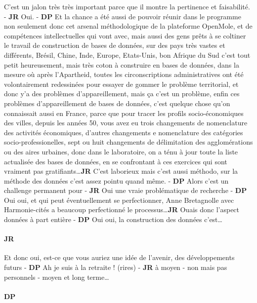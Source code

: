 \documentclass[12pt]{article}
\begin{document}
C'est un jalon très très important parce que il montre la pertinence et faisabilité. - \textbf{JR} Oui. - \textbf{DP} Et la chance a été aussi de pouvoir réunir dans le programme non seulement donc cet arsenal méthodologique de la plateforme OpenMole, et de compétences intellectuelles qui vont avec, mais aussi des gens prêts à se coltiner le travail de construction de bases de données, sur des pays très vastes et différents, Brésil, Chine, Inde, Europe, Etats-Unis, bon Afrique du Sud c'est tout petit heureusement, mais très coton à construire en bases de données, dans la mesure où après l'Apartheid, toutes les circonscriptions administratives ont été volontairement redessinées pour essayer de gommer le problème territorial, et donc y'a des problèmes d'appareillement, mais ça c'est un problème, enfin ces problèmes d'appareillement de bases de données, c'est quelque chose qu'on connaissait aussi en France, parce que pour tracer les profils socio-économiques des villes, depuis les années 50, vous avez eu trois changements de nomenclature des activités économiques, d'autres changements e nomenclature des catégories socio-professionelles, sept ou huit changements de délimitation des agglomérations ou des aires urbaines, donc dans le laboratoire, on a ténu à jour toute la liste actualisée des bases de données, en se confrontant à ces exercices qui sont vraiment pas gratifiants\ldots \textbf{JR} C'est laborieux mais c'est aussi méthodo, sur la méthode des données c'est assez pointu quand même. - \textbf{DP} Alors c'est un challenge permanent pour - \textbf{JR} Oui une vraie problématique de recherche - \textbf{DP} Oui oui, et qui peut éventuellement se perfectionner, Anne Bretagnolle avec Harmonie-cités a beaucoup perfectionné le processus\ldots \textbf{JR} Ouais donc l'aspect données à part entière - \textbf{DP} Oui oui, la construction des données c'est\ldots

\paragraph{JR}

Et donc oui, est-ce que vous auriez une idée de l'avenir, des développements futurs - \textbf{DP} Ah je suis à la retraite ! (rires) - \textbf{JR} à moyen - non mais pas personnels - moyen et long terme\ldots

\paragraph{DP}
\end{document}
